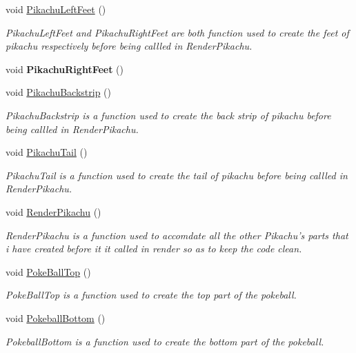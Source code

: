 \begin{DoxyCompactItemize}
\item 
void \hyperlink{class_scene_light_a51d4b22f8c6bf6d74225fd1725181603}{Pikachu\+Left\+Feet} ()
\begin{DoxyCompactList}\small\item\em Pikachu\+Left\+Feet and Pikachu\+Right\+Feet are both function used to create the feet of pikachu respectively before being callled in Render\+Pikachu. \end{DoxyCompactList}\item 
\hypertarget{class_scene_light_a5272028872a63074703f6b7470162d63}{void {\bfseries Pikachu\+Right\+Feet} ()}\label{class_scene_light_a5272028872a63074703f6b7470162d63}

\item 
void \hyperlink{class_scene_light_a8a23c6a2b293b2b8f81a5846865d34d1}{Pikachu\+Backstrip} ()
\begin{DoxyCompactList}\small\item\em Pikachu\+Backstrip is a function used to create the back strip of pikachu before being callled in Render\+Pikachu. \end{DoxyCompactList}\item 
void \hyperlink{class_scene_light_aad5eca9ad5ec115755aff98227547df3}{Pikachu\+Tail} ()
\begin{DoxyCompactList}\small\item\em Pikachu\+Tail is a function used to create the tail of pikachu before being callled in Render\+Pikachu. \end{DoxyCompactList}\item 
void \hyperlink{class_scene_light_aec85835deabe218d774b397ce8a1c18e}{Render\+Pikachu} ()
\begin{DoxyCompactList}\small\item\em Render\+Pikachu is a function used to accomdate all the other Pikachu's parts that i have created before it it called in render so as to keep the code clean. \end{DoxyCompactList}\item 
void \hyperlink{class_scene_light_adb3c2941d33259cf9ba58f9e2d6fb96f}{Poke\+Ball\+Top} ()
\begin{DoxyCompactList}\small\item\em Poke\+Ball\+Top is a function used to create the top part of the pokeball. \end{DoxyCompactList}\item 
void \hyperlink{class_scene_light_a35bb7ede9ffd535ca637a521ce472a16}{Pokeball\+Bottom} ()
\begin{DoxyCompactList}\small\item\em Pokeball\+Bottom is a function used to create the bottom part of the pokeball. \end{DoxyCompactList}\item 

\end{DoxyCompactItemize}
